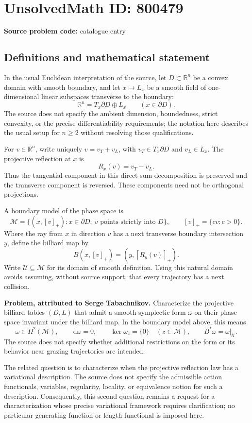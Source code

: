 \documentclass[11pt]{article}
\newcommand{\R}{\mathbb{R}}
\newcommand{\dd}{\,\mathrm{d}}
\begin{document}
\section*{UnsolvedMath ID: 800479}
\textbf{Source problem code:} catalogue entry
\subsection{Definitions and mathematical statement}
In the usual Euclidean interpretation of the source, let \(D\subset\R^n\) be a convex domain with smooth boundary, and let \(x\mapsto L_x\) be a smooth field of one-dimensional linear subspaces transverse to the boundary:
\[
\R^n=T_x\partial D\oplus L_x\qquad(x\in\partial D).
\]
The source does not specify the ambient dimension, boundedness, strict convexity, or the precise differentiability requirements; the notation here describes the usual setup for \(n\geq2\) without resolving those qualifications.

For \(v\in\R^n\), write uniquely \(v=v_T+v_L\), with \(v_T\in T_x\partial D\) and \(v_L\in L_x\). The projective reflection at \(x\) is
\[
R_x(v)=v_T-v_L.
\]
Thus the tangential component in this direct-sum decomposition is preserved and the transverse component is reversed. These components need not be orthogonal projections.

A boundary model of the phase space is
\[
\mathcal M=\{(x,[v]_+):x\in\partial D,\ v\text{ points strictly into }D\},
\qquad [v]_+=\{cv:c>0\}.
\]
Where the ray from \(x\) in direction \(v\) has a next transverse boundary intersection \(y\), define the billiard map by
\[
B(x,[v]_+)=(y,[R_y(v)]_+).
\]
Write \(\mathcal U\subseteq\mathcal M\) for its domain of smooth definition. Using this natural domain avoids assuming, without source support, that every trajectory has a next collision.

\textbf{Problem, attributed to Serge Tabachnikov.} Characterize the projective billiard tables \((D,L)\) that admit a smooth symplectic form \(\omega\) on their phase space invariant under the billiard map. In the boundary model above, this means
\[
\omega\in\Omega^2(\mathcal M),\qquad
\dd\omega=0,\qquad
\ker\omega_z=\{0\}\quad(z\in\mathcal M),\qquad
B^*\omega=\omega|_{\mathcal U}.
\]
The source does not specify whether additional restrictions on the form or its behavior near grazing trajectories are intended.

The related question is to characterize when the projective reflection law has a variational description. The source does not specify the admissible action functionals, variables, regularity, locality, or equivalence notion for such a description. Consequently, this second question remains a request for a characterization whose precise variational framework requires clarification; no particular generating function or length functional is imposed here.
\end{document}
